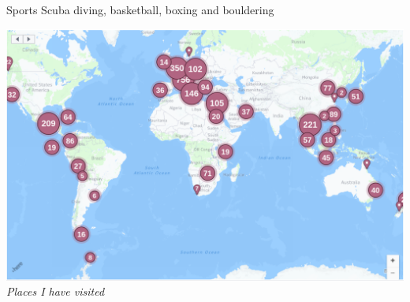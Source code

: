 \documentclass{tccv}
\begin{document}
\begin{factlist}
\item{Sports} {Scuba diving, basketball, boxing and bouldering}
\end{factlist}

\FloatBarrier
  \centering
  \includegraphics[scale = 0.2]{places_I_have_been_2.png}
  \textit{Places I have visited}
\FloatBarrier
\end{document}
